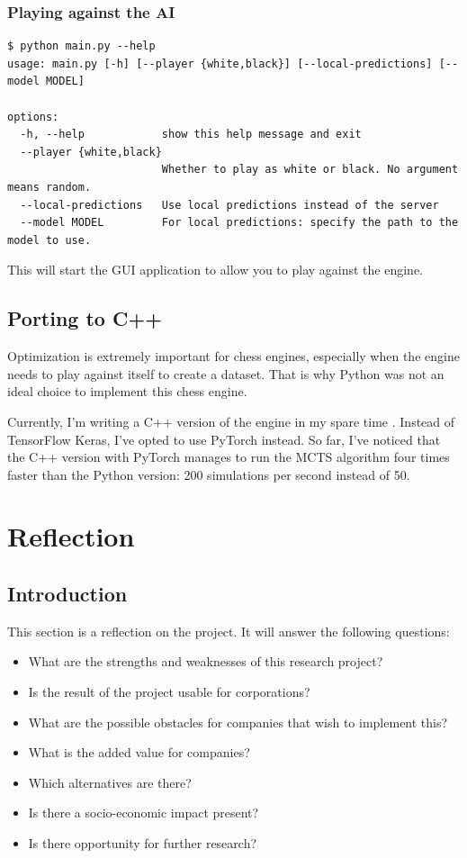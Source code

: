 \documentclass{article}
\begin{document}
\subsubsection{Playing against the AI}

\begin{verbatim}
$ python main.py --help
usage: main.py [-h] [--player {white,black}] [--local-predictions] [--model MODEL]

options:
  -h, --help            show this help message and exit
  --player {white,black}
                        Whether to play as white or black. No argument means random.
  --local-predictions   Use local predictions instead of the server
  --model MODEL         For local predictions: specify the path to the model to use.
\end{verbatim}

This will start the GUI application to allow you to play against the engine. 

\subsection{Porting to C++}

Optimization is extremely important for chess engines, especially when the engine needs to play
against itself to create a dataset. That is why Python was not an ideal choice to implement this chess engine.

Currently, I'm writing a C++ version of the engine in my spare time \cite{zjefferChessdeeprlcpp2022}. Instead of TensorFlow Keras, I've opted to 
use PyTorch instead. So far, I've noticed that the C++ version with PyTorch manages to run the MCTS algorithm 
four times faster than the Python version: 200 simulations per second instead of 50.




\newpage
\section{Reflection}

\subsection{Introduction}

This section is a reflection on the project. It will answer the following questions:

\begin{itemize}
    \item What are the strengths and weaknesses of this research project?
    \item Is the result of the project usable for corporations?
    \item What are the possible obstacles for companies that wish to implement this?
    \item What is the added value for companies?
    \item Which alternatives are there?
    \item Is there a socio-economic impact present?
    \item Is there opportunity for further research?
\end{itemize}
\end{document}
